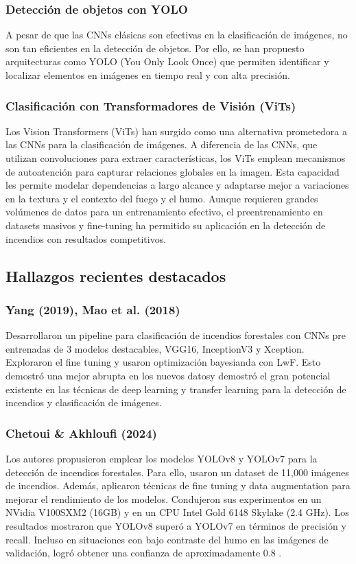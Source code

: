 \subsubsection{Detección de objetos con YOLO}
A pesar de que las CNNs clásicas son efectivas en la clasificación de imágenes, no
son tan eficientes en la detección de objetos. Por ello, se han propuesto arquitecturas
como YOLO (You Only Look Once) que permiten identificar y localizar elementos en
imágenes en tiempo real y con alta precisión.

\subsubsection{Clasificación con Transformadores de Visión (ViTs)}
Los Vision Transformers (ViTs) han surgido como una alternativa prometedora a las
CNNs para la clasificación de imágenes. A diferencia de las CNNs,
que utilizan convoluciones para extraer características, los ViTs emplean
mecanismos de autoatención para capturar relaciones globales en la imagen.
Esta capacidad les permite modelar dependencias a largo alcance y adaptarse mejor
a variaciones en la textura y el contexto del fuego y el humo. Aunque requieren
grandes volúmenes de datos para un entrenamiento efectivo, el preentrenamiento en datasets
masivos y fine-tuning ha permitido su aplicación en la detección de incendios con
resultados competitivos.

\subsection{Hallazgos recientes destacados}

\subsubsection{Yang (2019), Mao et al. (2018)}
Desarrollaron un pipeline para clasificación de incendios forestales con CNNs pre entrenadas
de 3 modelos destacables, VGG16, InceptionV3 y Xception. Exploraron el fine tuning y usaron
optimización bayesianda con LwF. Esto demostró una mejor abrupta en los nuevos datosy
demostró el gran potencial existente en las técnicas de deep learning y transfer learning
para la detección de incendios y clasificación de imágenes.

\subsubsection{Chetoui \& Akhloufi (2024)}
Los autores propusieron emplear los modelos YOLOv8 y YOLOv7 para la detección de incendios
forestales. Para ello, usaron un dataset de 11,000 imágenes de incendios. Además, aplicaron
técnicas de fine tuning y data augmentation para mejorar el rendimiento de los modelos.
Condujeron sus experimentos en un NVidia V100SXM2 (16GB) y en un CPU Intel Gold 6148 Skylake
(2.4 GHz). Los resultados mostraron que YOLOv8 superó a YOLOv7 en términos de precisión y
recall. Incluso en situaciones con bajo contraste del humo en las imágenes de validación,
logró obtener una confianza de aproximadamente 0.8 \cite{fire7040135}.

